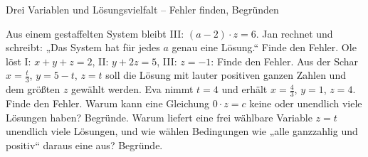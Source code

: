 \begin{aufgabe}{Drei Variablen und Lösungsvielfalt – Fehler finden, Begründen}
\begin{teile}
\teil Aus einem gestaffelten System bleibt III: $(a - 2) \cdot z = 6$. Jan rechnet  und schreibt: „Das System hat für jedes $a$ genau eine Lösung.“ Finde den Fehler.
\teil Ole löst I: $x + y + z = 2$, II: $y + 2z = 5$, III: $z = -1$:  Finde den Fehler.
\teil Aus der Schar $x = \frac{t}{3}$, $y = 5 - t$, $z = t$ soll die Lösung mit lauter positiven ganzen Zahlen und dem größten $z$ gewählt werden. Eva nimmt $t = 4$ und erhält $x = \frac{4}{3}$, $y = 1$, $z = 4$. Finde den Fehler.
\teil Warum kann eine Gleichung $0 \cdot z = c$ keine oder unendlich viele Lösungen haben? Begründe.
\teil Warum liefert eine frei wählbare Variable $z = t$ unendlich viele Lösungen, und wie wählen Bedingungen wie „alle ganzzahlig und positiv“ daraus eine aus? Begründe.
\end{teile}
\end{aufgabe}
